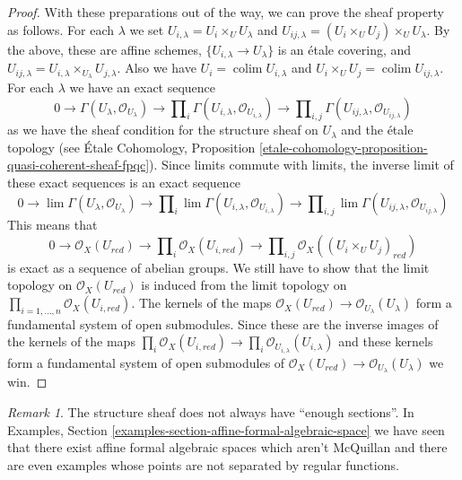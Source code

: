 \documentclass{stacks-project}
\theoremstyle{plain}
\theoremstyle{definition}
\theoremstyle{remark}
\newtheorem{remark}[subsection]{Remark}
\numberwithin{equation}{subsection}
\def\lim{\mathop{\mathrm{lim}}\nolimits}
\def\colim{\mathop{\mathrm{colim}}\nolimits}
\begin{document}
\begin{proof}
\medskip\noindent
With these preparations out of the way, we can prove the sheaf
property as follows. For each $\lambda$ we set
$U_{i, \lambda} = U_i \times_U U_\lambda$ and
$U_{ij, \lambda} = (U_i \times_U U_j) \times_U U_\lambda$.
By the above, these are affine schemes, $\{U_{i, \lambda} \to U_\lambda\}$
is an \'etale covering, and
$U_{ij, \lambda} = U_{i, \lambda} \times_{U_\lambda} U_{j, \lambda}$.
Also we have $U_i = \colim U_{i, \lambda}$ and
$U_i \times_U U_j = \colim U_{ij, \lambda}$.
For each $\lambda$ we have an exact sequence
$$
0 \to
\Gamma(U_\lambda, \mathcal{O}_{U_\lambda}) \to
\prod\nolimits_i \Gamma(U_{i, \lambda}, \mathcal{O}_{U_{i, \lambda}}) \to
\prod\nolimits_{i, j} \Gamma(U_{ij, \lambda}, \mathcal{O}_{U_{ij, \lambda}})
$$
as we have the sheaf condition for the structure sheaf
on $U_\lambda$ and the \'etale topology
(see \'Etale Cohomology, Proposition
\ref{etale-cohomology-proposition-quasi-coherent-sheaf-fpqc}).
Since limits commute with limits, the inverse limit of these
exact sequences is an exact sequence
$$
0 \to
\lim \Gamma(U_\lambda, \mathcal{O}_{U_\lambda}) \to
\prod\nolimits_i \lim \Gamma(U_{i, \lambda}, \mathcal{O}_{U_{i, \lambda}}) \to
\prod\nolimits_{i, j} \lim
\Gamma(U_{ij, \lambda}, \mathcal{O}_{U_{ij, \lambda}})
$$
This means that
$$
0 \to
\mathcal{O}_X(U_{red}) \to
\prod\nolimits_i \mathcal{O}_X(U_{i, red}) \to
\prod\nolimits_{i, j} \mathcal{O}_X((U_i \times_U U_j)_{red})
$$
is exact as a sequence of abelian groups. We still have to
show that the limit topology on $\mathcal{O}_X(U_{red})$ is induced
from the limit topology on
$\prod_{i = 1, \ldots, n} \mathcal{O}_X(U_{i, red})$.
The kernels of the maps
$\mathcal{O}_X(U_{red}) \to \mathcal{O}_{U_\lambda}(U_\lambda)$
form a fundamental system of open submodules. Since these are the inverse
images of the kernels of the maps
$\prod_i \mathcal{O}_X(U_{i, red}) \to
\prod_i \mathcal{O}_{U_{i, \lambda}}(U_{i, \lambda})$
and these kernels form a fundamental system of open submodules
of $\mathcal{O}_X(U_{red}) \to \mathcal{O}_{U_\lambda}(U_\lambda)$
we win.
\end{proof}

\begin{remark}
\label{remark-not-enough-sections}
The structure sheaf does not always have ``enough sections''.
In Examples, Section \ref{examples-section-affine-formal-algebraic-space}
we have seen that there exist affine formal algebraic spaces which
aren't McQuillan and there are even examples whose points are not
separated by regular functions.
\end{remark}
\end{document}
